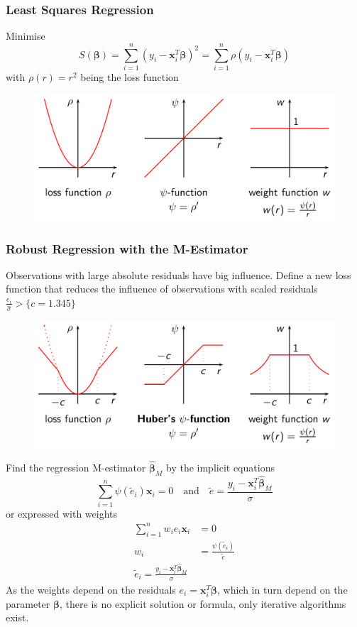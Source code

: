\documentclass[11pt]{article}
\theoremstyle{definition}
\begin{document}
\subsubsection{Least Squares Regression}
Minimise
\begin{equation*}
	S(\bm{\beta}) = \sum_{i=1}^n(y_i - \bm{x}_i^T\bm{\beta})^2 = \sum_{i=1}^{n}\rho(y_i - \bm{x}_i^T\bm{\beta})
\end{equation*}
with $\rho(r) = r^2$ being the loss function
\begin{figure}[H]
	\centering
	\includegraphics[width=0.8\linewidth]{img/loss_function}
\end{figure}

\subsubsection{Robust Regression with the M-Estimator}
Observations with large absolute residuals have big influence. Define a new loss function that reduces the  influence of observations with scaled residuals $\frac{e_i}{\hat{\sigma}} > \{c=1.345\}$
\begin{figure}[H]
	\centering
	\includegraphics[width=0.8\linewidth]{img/robust_m_estimator.png}
\end{figure}
Find the regression M-estimator $\hat{\bm{\beta}}_M$ by the implicit equations
\begin{equation*}
	\sum_{i=1}^{n}\psi(\tilde{e}_i)\bm{x}_i = 0\quad\text{and}\quad\tilde{e}=\frac{y_i - \bm{x}_i^T\hat{\bm{\beta}}_M}{\sigma}
\end{equation*}
or expressed with weights
\begin{align*}
	\sum_{i=1}^{n}w_i e_i\bm{x}_i &= 0\\
	w_i &= \frac{\psi(\tilde{e}_i)}{\tilde{e}}\\
	\tilde{e}_i = \frac{y_i -\bm{x}_i^T\hat{\bm{\beta}}_M}{\sigma}
\end{align*}
As the weights depend on the residuals $e_i = \bm{x}_i^T\bm{\beta}$, which in turn depend on the parameter $\bm{\beta}$, there is no explicit solution or formula, only iterative algorithms exist.
\end{document}

